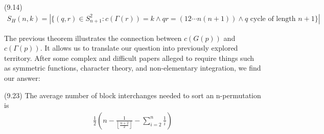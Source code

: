 \begin{theorem}
(9.14) 
\begin{align*}
S_H(n,k) = | \{ (q,r) \in S_{n+1}^2 : c(\Gamma (r)) = k \wedge qr = (12 \cdots n(n+1)) \wedge q \text{ cycle of length } n+1 \} |
\end{align*}
\end{theorem}

The previous theorem illustrates the connection between $c(G(p))$ and $c(\Gamma (p))$. It allows us to translate our question into previously explored territory. After some complex and difficult papers alleged to require things such as symmetric functions, character theory, and non-elementary integration, we find our answer:

\begin{theorem}
(9.23) The average number of block interchanges needed to sort an n-permutation is
\begin{align*}
\frac{1}{2} \left( n- \frac{1}{ \left \lfloor{\frac{n+2}{2}}\right \rfloor} - \sum^n_{i=2} \frac{1}{i} \right)
\end{align*}\end{theorem}

\begin{appendix}


\end{appendix}

